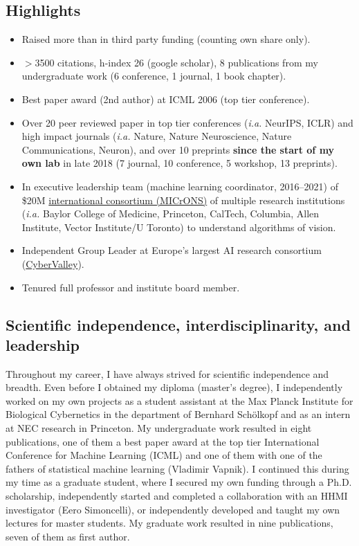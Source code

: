\documentclass[COG,11pt]{ercgrant}
\begin{document}
\subsection{Highlights}
\begin{itemize}
    \item Raised more than  in third party funding (counting own share only).
    \item $>$3500 citations, h-index 26 (google scholar), 8 publications from my undergraduate work (6 conference, 1 journal, 1 book chapter).
    \item Best paper award (2nd author) at ICML 2006 (top tier conference).
    \item Over 20 peer reviewed paper in top tier conferences (\textit{i.a.} NeurIPS, ICLR) and high impact journals (\textit{i.a.} Nature, Nature Neuroscience, Nature Communications, Neuron), and over 10 preprints \textbf{since the start of my own lab} in late 2018 (7 journal, 10  conference, 5 workshop, 13 preprints).
    \item In executive leadership team (machine learning coordinator, 2016--2021) of \$20M \href{https://www.ninai.org/}{international consortium (MICrONS)} of multiple research institutions (\textit{i.a.} Baylor College of Medicine, Princeton, CalTech, Columbia, Allen Institute, Vector Institute/U Toronto) to understand algorithms of vision.
    \item Independent Group Leader at Europe's largest AI research consortium (\href{https://cyber-valley.de/}{CyberValley}).
    \item Tenured full professor and institute board member. 
\end{itemize}

\subsection{Scientific independence, interdisciplinarity, and leadership}
Throughout my career, I have always strived for scientific independence and breadth. Even before I obtained my diploma (master's degree), I independently worked on my own  projects as a student assistant at the Max Planck Institute for Biological Cybernetics in the department of Bernhard Schölkopf and as an intern at NEC research in Princeton. My undergraduate work resulted in eight publications, one of them a best paper award at the top tier International Conference for Machine Learning (ICML) and one of them with one of the fathers of statistical machine learning (Vladimir Vapnik). I continued this during my time as a graduate student, where I secured my own funding through a Ph.D. scholarship, independently started and completed a collaboration with an HHMI investigator (Eero Simoncelli), or independently developed and taught my own lectures for master students. My graduate work resulted in nine publications, seven of them as first author. 
\end{document}
